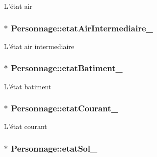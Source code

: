 L'état air \hypertarget{classPersonnage_af8486012a3832c816fdd472ea12e5d7e}{
\subsubsection[{etat\-Air\-Intermediaire\-\_\-}]{$\ast$ Personnage\-::etat\-Air\-Intermediaire\-\_\-\hspace{0.3cm}{\ttfamily [protected]}}}\label{classPersonnage_af8486012a3832c816fdd472ea12e5d7e}
L'état air intermediaire \hypertarget{classPersonnage_a0fe6bd498f59727fc05660072f76692e}{
\subsubsection[{etat\-Batiment\-\_\-}]{$\ast$ Personnage\-::etat\-Batiment\-\_\-\hspace{0.3cm}{\ttfamily [protected]}}}\label{classPersonnage_a0fe6bd498f59727fc05660072f76692e}
L'état batiment \hypertarget{classPersonnage_ad5595cd1429d9530f1cd5bc91e9ce3f5}{
\subsubsection[{etat\-Courant\-\_\-}]{$\ast$ Personnage\-::etat\-Courant\-\_\-\hspace{0.3cm}{\ttfamily [protected]}}}\label{classPersonnage_ad5595cd1429d9530f1cd5bc91e9ce3f5}
L'état courant \hypertarget{classPersonnage_adb14823c721de74a21f1d2cf81a21afe}{
\subsubsection[{etat\-Sol\-\_\-}]{$\ast$ Personnage\-::etat\-Sol\-\_\-\hspace{0.3cm}{\ttfamily [protected]}}}\label{classPersonnage_adb14823c721de74a21f1d2cf81a21afe}
